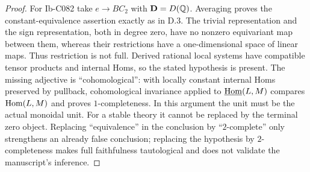 \begin{proof}
For Ib-C082 take $e\to BC_2$ with $\mathbf D=D(\mathbb Q)$. Averaging proves the constant-equivalence assertion exactly as in D.3. The trivial representation and the sign representation, both in degree zero, have no nonzero equivariant map between them, whereas their restrictions have a one-dimensional space of linear maps. Thus restriction is not full. Derived rational local systems have compatible tensor products and internal Homs, so the stated hypothesis is present. The missing adjective is ``cohomological'': with locally constant internal Homs preserved by pullback, cohomological invariance applied to $\underline{\operatorname{Hom}}(L,M)$ compares $\operatorname{Hom}(L,M)$ and proves $1$-completeness. In this argument the unit must be the actual monoidal unit. For a stable theory it cannot be replaced by the terminal zero object. Replacing ``equivalence'' in the conclusion by ``$2$-complete'' only strengthens an already false conclusion; replacing the hypothesis by $2$-completeness makes full faithfulness tautological and does not validate the manuscript's inference.
\end{proof}

